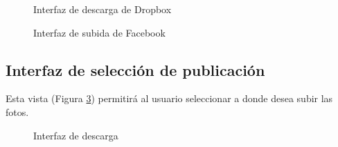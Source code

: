 \documentclass{scrartcl}
\begin{document}
\begin{figure}[H]
	
	\centering
	\caption{Interfaz de descarga de Dropbox}
	\label{fig:VistaDescargaDropbox}
	
\end{figure}
\begin{figure}[H]
	
	\centering
	\caption{Interfaz de subida de Facebook}
	\label{fig:VistaSubidaFacebook}
	
\end{figure}
\subsection{Interfaz de selección de publicación}
Esta vista (Figura \ref{fig:VistaDescarga}) permitirá al usuario seleccionar a donde desea subir las fotos.

\begin{figure}[H]
	
	\centering
	\caption{Interfaz de descarga}
	\label{fig:VistaDescarga}
	
\end{figure}
\end{document}
